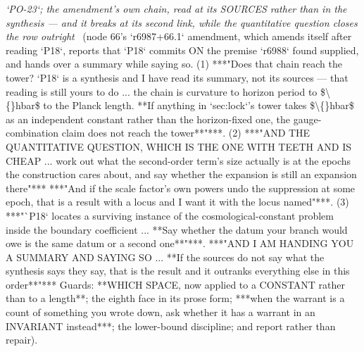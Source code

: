\begin{description}
\textit{`PO-23`; the amendment's own chain, read at its SOURCES rather than in the synthesis --- and it breaks at its second link, while the quantitative question closes the row outright} \ (node 66's `r6987+66.1` amendment, which amends itself after reading `P18`, reports that `P18` commits ON the premise `r6988` found supplied, and hands over a summary while saying so. (1) ***"Does that chain reach the tower?  `P18` is a synthesis and I have read its summary, not its sources --- that reading is still yours to do ... the chain is curvature to horizon period to \$\textbackslash\{\}hbar\$ to the Planck length.  **If anything in `sec:lock`'s tower takes \$\textbackslash\{\}hbar\$ as an independent constant rather than the horizon-fixed one, the gauge-combination claim does not reach the tower**"***. (2) ***"AND THE QUANTITATIVE QUESTION, WHICH IS THE ONE WITH TEETH AND IS CHEAP ... work out what the second-order term's size actually is at the epochs the construction cares about, and say whether the expansion is still an expansion there"***  ***"And if the scale factor's own powers undo the suppression at some epoch, that is a result with a locus and I want it with the locus named"***. (3) ***"`P18` locates a surviving instance of the cosmological-constant problem inside the boundary coefficient ... **Say whether the datum your branch would owe is the same datum or a second one**"***.  ***"AND I AM HANDING YOU A SUMMARY AND SAYING SO ... **If the sources do not say what the synthesis says they say, that is the result and it outranks everything else in this order**"***  Guards: **WHICH SPACE, now applied to a CONSTANT rather than to a length**; the eighth face in its prose form; ***when the warrant is a count of something you wrote down, ask whether it has a warrant in an INVARIANT instead***; the lower-bound discipline; and report rather than repair). 

\end{description}
